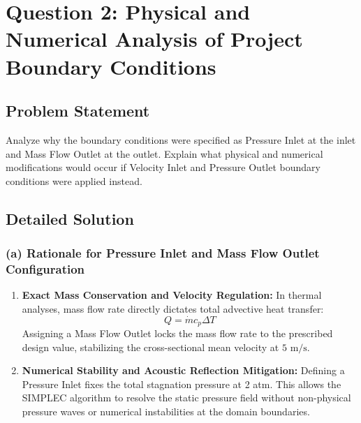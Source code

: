 \documentclass[12pt,a4paper]{report}
\begin{document}
\section{Question 2: Physical and Numerical Analysis of Project Boundary Conditions}

\subsection*{Problem Statement}
Analyze why the boundary conditions were specified as Pressure Inlet at the inlet and Mass Flow Outlet at the outlet. Explain what physical and numerical modifications would occur if Velocity Inlet and Pressure Outlet boundary conditions were applied instead.

\subsection*{Detailed Solution}

\subsubsection{(a) Rationale for Pressure Inlet and Mass Flow Outlet Configuration}
\begin{enumerate}
    \item \textbf{Exact Mass Conservation and Velocity Regulation:} In thermal analyses, mass flow rate directly dictates total advective heat transfer:
    \begin{equation}
    Q = \dot{m} c_p \Delta T
    \end{equation}
    Assigning a Mass Flow Outlet locks the mass flow rate to the prescribed design value, stabilizing the cross-sectional mean velocity at $5\text{ m/s}$.
    \item \textbf{Numerical Stability and Acoustic Reflection Mitigation:} Defining a Pressure Inlet fixes the total stagnation pressure at 2 atm. This allows the SIMPLEC algorithm to resolve the static pressure field without non-physical pressure waves or numerical instabilities at the domain boundaries.
\end{enumerate}
\end{document}
